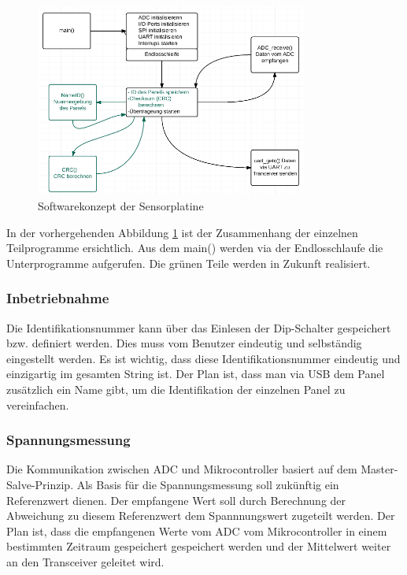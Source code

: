 \begin{figure}[htb]
\centering
\includegraphics[width=0.8\textwidth]{sections/data/Sensorplatine}
\caption{Softwarekonzept der Sensorplatine}
\label{DiagrammSP}
\end{figure}

In der vorhergehenden Abbildung \ref{DiagrammSP} ist der Zusammenhang der einzelnen Teilprogramme ersichtlich. Aus dem main() werden via der Endlosschlaufe die Unterprogramme aufgerufen. Die grünen Teile werden in Zukunft realisiert.

\subsubsection{Inbetriebnahme}
Die Identifikationsnummer kann über das Einlesen der Dip-Schalter gespeichert bzw. definiert werden. Dies muss vom Benutzer eindeutig und selbständig eingestellt werden. Es ist wichtig, dass diese Identifikationsnummer eindeutig und einzigartig im gesamten String ist. Der Plan ist, dass man via USB dem Panel zusätzlich ein Name gibt, um die Identifikation der einzelnen Panel zu vereinfachen. 

\subsubsection{Spannungsmessung}
Die Kommunikation zwischen ADC und Mikrocontroller basiert auf dem Master-Salve-Prinzip. 
Als Basis für die Spannungsmessung soll zukünftig ein Referenzwert dienen. Der empfangene Wert soll durch Berechnung der Abweichung zu diesem Referenzwert dem Spannnungswert zugeteilt werden. Der Plan ist, dass die empfangenen Werte vom ADC vom Mikrocontroller in einem bestimmten Zeitraum gespeichert gespeichert werden und der Mittelwert weiter an den Transceiver geleitet wird.

